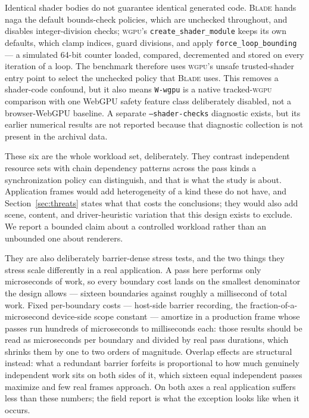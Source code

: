 \documentclass[10pt,twocolumn]{article}
\newcommand{\blade}{\textsc{Blade}}
\newcommand{\wgpu}{\textsc{wgpu}}
\begin{document}
Identical shader bodies do not guarantee identical generated code. \blade{} hands
naga the default bounds-check policies, which are unchecked throughout, and
disables integer-division checks; \wgpu's \texttt{create\_shader\_module}
keeps its own defaults, which clamp indices, guard divisions, and apply
\texttt{force\_loop\_bounding} --- a simulated 64-bit counter loaded, compared,
decremented and stored on every iteration of a loop. The benchmark therefore
uses \wgpu's unsafe trusted-shader entry point to select the unchecked policy
that \blade{} uses. This removes a shader-code confound, but it also means
\texttt{W-wgpu} is a native tracked-\wgpu{} comparison with one WebGPU safety
feature class deliberately disabled, not a browser-WebGPU baseline. A separate
\texttt{--shader-checks} diagnostic exists, but its earlier numerical results
are not reported because that diagnostic collection is not present in the
archival data.

These six are the whole workload set, deliberately. They contrast independent
resource sets with chain dependency patterns across the pass kinds a
synchronization policy can distinguish, and that is what the study is about.
Application frames would add heterogeneity of a kind these do not have, and
Section~\ref{sec:threats} states what that costs the conclusions; they would
also add scene, content, and driver-heuristic variation that this design exists
to exclude. We report a bounded claim about a controlled workload rather than
an unbounded one about renderers.

They are also deliberately barrier-dense stress tests, and the two things
they stress scale differently in a real application. A pass here performs
only microseconds of work, so every boundary cost lands on the smallest
denominator the design allows --- sixteen boundaries against roughly a
millisecond of total work. Fixed per-boundary costs --- host-side barrier
recording, the fraction-of-a-microsecond device-side scope constant ---
amortize in a production frame whose passes run hundreds of microseconds to
milliseconds each: those results should be read as microseconds per boundary
and divided by real pass durations, which shrinks them by one to two orders
of magnitude. Overlap effects are structural instead: what a redundant
barrier forfeits is proportional to how much genuinely independent work sits
on both sides of it, which sixteen equal independent passes maximize and few
real frames approach. On both axes a real application suffers less than
these numbers; the field report is what the exception looks like when it
occurs.
\end{document}
